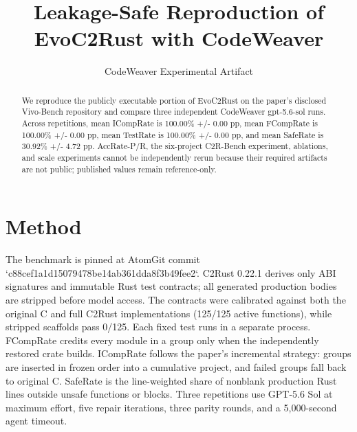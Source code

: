 \documentclass{article}
\title{Leakage-Safe Reproduction of EvoC2Rust with CodeWeaver}
\author{CodeWeaver Experimental Artifact}
\begin{document}
\maketitle
\begin{abstract}
We reproduce the publicly executable portion of EvoC2Rust on the paper's disclosed Vivo-Bench repository and compare three independent CodeWeaver gpt-5.6-sol runs. Across repetitions, mean ICompRate is 100.00\% +/- 0.00 pp, mean FCompRate is 100.00\% +/- 0.00 pp, mean TestRate is 100.00\% +/- 0.00 pp, and mean SafeRate is 30.92\% +/- 4.72 pp. AccRate-P/R, the six-project C2R-Bench experiment, ablations, and scale experiments cannot be independently rerun because their required artifacts are not public; published values remain reference-only.
\end{abstract}
\section{Method}
The benchmark is pinned at AtomGit commit `c88cef1a1d15079478be14ab361dda8f3b49fee2`. C2Rust 0.22.1 derives only ABI signatures and immutable Rust test contracts; all generated production bodies are stripped before model access. The contracts were calibrated against both the original C and full C2Rust implementations (125/125 active functions), while stripped scaffolds pass 0/125. Each fixed test runs in a separate process. FCompRate credits every module in a group only when the independently restored crate builds. ICompRate follows the paper's incremental strategy: groups are inserted in frozen order into a cumulative project, and failed groups fall back to original C. SafeRate is the line-weighted share of nonblank production Rust lines outside unsafe functions or blocks. Three repetitions use GPT-5.6 Sol at maximum effort, five repair iterations, three parity rounds, and a 5,000-second agent timeout.
\end{document}
